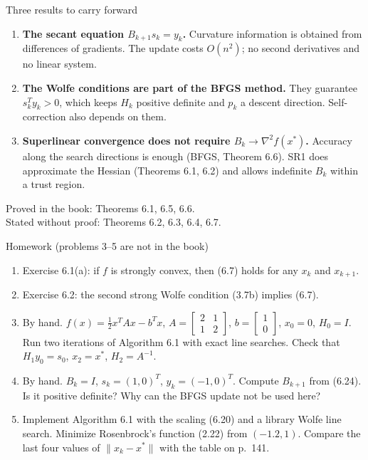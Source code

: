 \documentclass[aspectratio=169,12pt]{beamer}
\newcommand{\xs}{x^{*}}
\newcommand{\hessf}{\nabla^{2} f}
\begin{document}
\begin{frame}{Three results to carry forward}
  \begin{enumerate}\setlength\itemsep{0.7em}
    \item \textbf{The secant equation $B_{k+1}s_{k}=y_{k}$.} Curvature information is obtained from
      differences of gradients. The update costs $O(n^{2})$; no second derivatives and no
      linear system.
    \item \textbf{The Wolfe conditions are part of the BFGS method.} They guarantee
      $s_{k}^{T}y_{k}>0$, which keeps $H_{k}$ positive definite and $p_{k}$ a descent direction.
      Self-correction also depends on them.
    \item \textbf{Superlinear convergence does not require $B_{k}\to\hessf(\xs)$.} Accuracy along the
      search directions is enough (BFGS, Theorem 6.6). SR1 does approximate the
      Hessian (Theorems 6.1, 6.2) and allows indefinite $B_{k}$ within a trust region.
  \end{enumerate}

  \vspace{0.8em}
  Proved in the book: Theorems 6.1, 6.5, 6.6.\\ Stated without proof: Theorems 6.2, 6.3, 6.4, 6.7.
\end{frame}

\begin{frame}{Homework {\normalfont\small(problems 3--5 are not in the book)}}
  \begin{enumerate}\setlength\itemsep{0.5em}
    \item Exercise 6.1(a): if $f$ is strongly convex, then (6.7) holds for any $x_{k}$ and $x_{k+1}$.
    \item Exercise 6.2: the second strong Wolfe condition (3.7b) implies (6.7).
    \item By hand. $f(x)=\tfrac12x^{T}Ax-b^{T}x$,
      $A=\begin{bmatrix}2&1\\1&2\end{bmatrix}$, $b=\begin{bmatrix}1\\0\end{bmatrix}$, $x_{0}=0$,
      $H_{0}=I$. Run two iterations of Algorithm 6.1 with exact line searches.
      Check that $H_{1}y_{0}=s_{0}$, $x_{2}=\xs$, $H_{2}=A^{-1}$.
    \item By hand. $B_{k}=I$, $s_{k}=(1,0)^{T}$, $y_{k}=(-1,0)^{T}$. Compute $B_{k+1}$ from (6.24).
      Is it positive definite? Why can the BFGS update not be used here?
    \item Implement Algorithm 6.1 with the scaling (6.20) and a library Wolfe line search.
      Minimize Rosenbrock's function (2.22) from $(-1.2,1)$. Compare the last four values
      of $\|x_{k}-\xs\|$ with the table on p.~141.
  \end{enumerate}
\end{frame}
\end{document}
